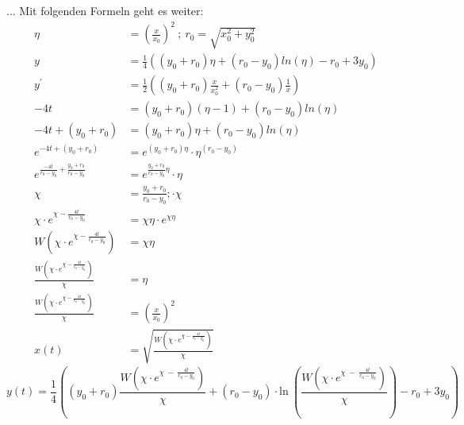 ... Mit folgenden Formeln geht es weiter:
\begin{align*}
	\eta
	&=
	\left(\frac{x}{x_0}\right)^2 
	\:;\:
	r_0
	=
	\sqrt{x_0^2+y_0^2} \\
	y
	&=
	\frac{1}{4}\left(\left(y_0+r_0\right)\eta+\left(r_0-y_0\right)ln\left(\eta\right)-r_0+3y_0\right) \\
	y^\prime
	&=
	\frac{1}{2}\left(\left(y_0+r_0\right)\frac{x}{x_0^2}+\left(r_0-y_0\right)\frac{1}{x}\right) \\
	-4t
	&=
	\left(y_0+r_0\right)\left(\eta-1\right)+\left(r_0-y_0\right)ln\left(\eta\right) \\
	-4t+\left(y_0+r_0\right)
	&=
	\left(y_0+r_0\right)\eta+\left(r_0-y_0\right)ln\left(\eta\right) \\
	e^{-4t+\left(y_0+r_0\right)}
	&=
	e^{\left(y_0+r_0\right)\eta}\cdot\eta^{\left(r_0-y_0\right)} \\
	e^{\frac{-4t}{r_0-y_0}+\frac{y_0+r_0}{r_0-y_0}}
	&=
	e^{\frac{y_0+r_0}{r_0-y_0}\eta}\cdot\eta\  \\
	\chi
	&=
	\frac{y_0+r_0}{r_0-y_0}; \cdot\chi \\
	\chi\cdot e^{\chi-\frac{4t}{r_0-y_0}}
	&=
	\chi\eta\cdot e^{\chi\eta} \\
	W\left(\chi\cdot e^{\chi-\frac{4t}{r_0-y_0}}\right)
	&=
	\chi\eta \\
	\frac{W\left(\chi\cdot e^{\chi-\frac{4t}{r_0-y_0}}\right)}{\chi}
	&=
	\eta \\
	\frac{W\left(\chi\cdot e^{\chi-\frac{4t}{r_0-y_0}}\right)}{\chi}
	&=
	\left(\frac{x}{x_0}\right)^2 \\
	x\left(t\right)
	&=
	\sqrt{\frac{W\left(\chi\cdot e^{\chi-\frac{4t}{r_0-y_0}}\right)}{\chi}}
\end{align*}
\begin{equation}
	y(t)
	=
	\frac{1}{4}\left(\left(y_0+r_0\right)\frac{W\left(\chi\cdot e^{\chi\ -\ \frac{4t}{r_0-y_0}}\right)}{\chi}+\left(r_0-y_0\right)\cdot\mathrm{ln}\ \left(\frac{W\left(\chi\cdot e^{\chi\ -\ \frac{4t}{r_0-y_0}}\right)}{\chi}\right)-r_0+3y_0\right)
	\label{lambertw:funkNachT}
\end{equation}
